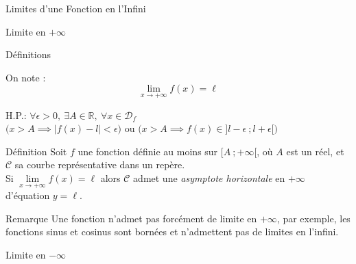 \documentclass{coursbook}
\begin{document}
\begin{Gpartie}{Limites d'une Fonction en l'Infini}
\begin{Spartie}{Limite en $+\infty$}
\begin{SSpartie}{Définitions}
\begin{itemize}
                    On note : \[\boxed{\lim\limits_{x\to +\infty}f(x)=\ell}\]
                    \begin{center}
                        \parbox{\linewidth}{}
                    \end{center}
                    H.P.: $\forall\epsilon >0,~\exists A\in\mathbb{R},~\forall x\in\mathcal{D}_f$ \\ \phantom{H.P.: }$\bigg(x>A\implies\left\lvert f(x)-l\right\rvert <\epsilon\bigg)$ ou $\bigg(x>A\implies f(x)\in\big]l-\epsilon~;l+\epsilon\big[\bigg)$
                \end{itemize}
            \end{SSpartie}
            \pagebreak
            \begin{SSpartie}{Définition} 
                Soit $f$ une fonction définie au moins sur $\big[A~;+\infty\big[$, où $A$ est un réel, et $\mathcal{C}$ sa courbe représentative dans un repère. \\ Si $\lim\limits_{x\to+\infty}f(x)=\ell$ alors $\mathcal{C}$ admet une \emph{asymptote horizontale} en $+\infty$ \\ d'équation $y=\ell$.
            \end{SSpartie}
            \begin{SSpartie}{Remarque} 
                Une fonction n'admet pas forcément de limite en $+\infty$, par exemple, les fonctions sinus et cosinus sont bornées et n'admettent pas de limites en l'infini.
            \end{SSpartie}
        \end{Spartie}
        \begin{Spartie}{Limite en $-\infty$} 

\end{Spartie}
\end{Gpartie}
\end{document}
